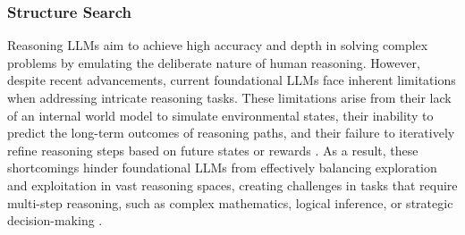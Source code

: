 



\subsubsection{Structure Search}\label{structure_search}
 
Reasoning LLMs aim to achieve high accuracy and depth in solving complex problems by emulating the deliberate nature of human reasoning. 
However, despite recent advancements, current foundational LLMs face inherent limitations when addressing intricate reasoning tasks. 
These limitations arise from their lack of an internal world model to simulate environmental states, their inability to predict the long-term outcomes of reasoning paths, and their failure to iteratively refine reasoning steps based on future states or rewards \cite{huang2023towards}. 
As a result, these shortcomings hinder foundational LLMs from effectively balancing exploration and exploitation in vast reasoning spaces, creating challenges in tasks that require multi-step reasoning, such as complex mathematics, logical inference, or strategic decision-making \cite{DBLP:journals/corr/abs-2405-00451}.

